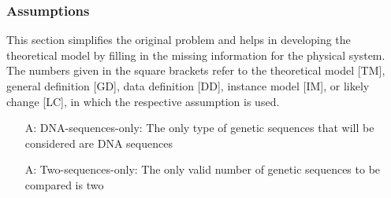 \documentclass[12pt]{article}
\newcounter{assumpnum} %
\begin{document}


\subsubsection{Assumptions} \label{sec_assumpt}


This section simplifies the original problem and helps in developing the
theoretical model by filling in the missing information for the physical system.
The numbers given in the square brackets refer to the theoretical model [TM],
general definition [GD], data definition [DD], instance model [IM], or likely
change [LC], in which the respective assumption is used.

\begin{itemize}

\item[A\refstepcounter{assumpnum}\theassumpnum \label{dna-sequences-only}:]
DNA-sequences-only: The only type of genetic sequences that will be considered are DNA sequences
\item[A\refstepcounter{assumpnum}\theassumpnum \label{two-sequences-only}:]
Two-sequences-only: The only valid number of genetic sequences to be compared is two

\end{itemize}
\end{document}
